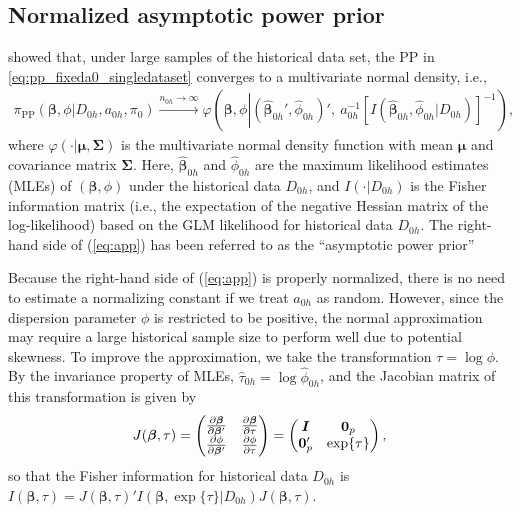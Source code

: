 \subsection{Normalized asymptotic power prior}
\label{sec:napp}
\citet{ibrahim2000power} showed that, under large samples of the historical data set, the PP in \eqref{eq:pp_fixeda0_singledataset} converges to a multivariate normal density, i.e.,
\begin{align}
  \pi_{\text{PP}}(\bm{\beta}, \phi | D_{0h}, a_{0h}, \pi_0) \overset{n_{0h} \to \infty}{\to} \varphi\left( \bm{\beta}, \phi \left| (\hat{\bm{\beta}}_{0h}', \hat{\phi}_{0h})', ~a_{0h}^{-1} \left[ I(\hat{\bm{\beta}}_{0h}, \hat{\phi}_{0h} | D_{0h} ) \right]^{-1} \right) \right.,
  \label{eq:app}
\end{align}
where $\varphi(\cdot | \bm{\mu}, \bm{\Sigma})$ is the multivariate normal density function with mean $\bm{\mu}$ and covariance matrix $\bm{\Sigma}$. Here, $\hat{\bm{\beta}}_{0h}$ and $\hat{\phi}_{0h}$ are the maximum likelihood estimates (MLEs) of $(\bm{\beta}, \phi)$ under the historical data $D_{0h}$, and $I(\cdot | D_{0h})$ is the Fisher information matrix (i.e., the expectation of the negative Hessian matrix of the log-likelihood) based on the GLM likelihood for historical data $D_{0h}$.
The right-hand side of (\ref{eq:app}) has been referred to as the ``asymptotic power prior'' \citep{ibrahim2015power}

Because the right-hand side of (\ref{eq:app}) is properly normalized, there is no need to estimate a normalizing constant if we treat $a_{0h}$ as random.
However, since the dispersion parameter $\phi$ is restricted to be positive, the normal approximation may require a large historical sample size to perform well due to potential skewness. To improve the approximation, we take the transformation $\tau = \log \phi$.
By the invariance property of MLEs, $\hat{\tau}_{0h} = \log \hat{\phi}_{0h}$, and the Jacobian matrix of this transformation is given by
$$
  J(\bm{\beta}, \tau) = \begin{pmatrix}
     \pdv{\bm{\beta}}{\bm{\beta}'} & \pdv{\bm{\beta}}{\tau} \\
     \pdv{\phi}{\bm{\beta}'}       & \pdv{\phi}{\tau}
  \end{pmatrix}
  = \begin{pmatrix}
     \bm{I}  & \bm{0}_p \\
     \bm{0}_p' & \exp{\tau}
  \end{pmatrix},
$$
so that the Fisher information for historical data $D_{0h}$ is $I(\bm{\beta}, \tau) = J(\bm{\beta}, \tau)' I(\bm{\beta}, \exp\{\tau\} | D_{0h}) J(\bm{\beta}, \tau)$.

